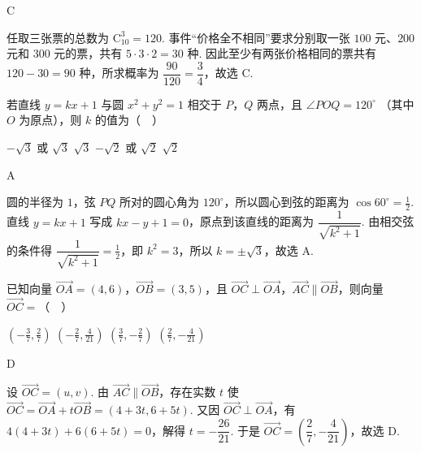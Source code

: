 \begin{answer}
C
\end{answer}

\begin{solution}
任取三张票的总数为 \(\mathrm C_{10}^{3}=120\). 事件“价格全不相同”要求分别取一张 \(100\) 元、\(200\) 元和 \(300\) 元的票，共有 \(5\cdot3\cdot2=30\) 种. 因此至少有两张价格相同的票共有 \(120-30=90\) 种，所求概率为 \(\dfrac{90}{120}=\dfrac34\)，故选 C.
\end{solution}

\begin{problem}
若直线 \( y = kx + 1 \) 与圆 \( x^{2} + y^{2} = 1 \) 相交于 \(P\)，\(Q\) 两点，且 \( \angle POQ = 120^{\circ} \) （其中 \(O\) 为原点），则 \( k \) 的值为（\(\quad\)）

\choices
    {\(-\sqrt{3}\) 或 \(\sqrt{3}\)}
    {\(\sqrt{3}\)}
    {\(-\sqrt{2}\) 或 \(\sqrt{2}\)}
    {\(\sqrt{2}\)}
\end{problem}

\begin{answer}
A
\end{answer}

\begin{solution}
圆的半径为 \(1\)，弦 \(PQ\) 所对的圆心角为 \(120^{\circ}\)，所以圆心到弦的距离为 \(\cos60^{\circ}=\frac12\). 直线 \(y=kx+1\) 写成 \(kx-y+1=0\)，原点到该直线的距离为 \(\dfrac{1}{\sqrt{k^2+1}}\). 由相交弦的条件得 \(\dfrac{1}{\sqrt{k^2+1}}=\frac12\)，即 \(k^2=3\)，所以 \(k=\pm\sqrt3\)，故选 A.
\end{solution}

\begin{problem}
已知向量 \(\overrightarrow{OA} = (4,6)\)，\(\overrightarrow{OB} = (3,5)\)，且 \(\overrightarrow{OC} \perp \overrightarrow{OA}\)，\(\overrightarrow{AC} \parallel \overrightarrow{OB}\)，则向量 \(\overrightarrow{OC} =\)（\(\quad\)）

\choices
    {\( \left(-\frac{3}{7},\frac{2}{7}\right) \)}
    {\( \left(-\frac{2}{7},\frac{4}{21}\right) \)}
    {\(\left(\frac{3}{7}, -\frac{2}{7}\right)\)}
    {\(\left(\frac{2}{7}, -\frac{4}{21}\right)\)}
\end{problem}

\begin{answer}
D
\end{answer}

\begin{solution}
设 \(\overrightarrow{OC}=(u,v)\). 由 \(\overrightarrow{AC}\parallel\overrightarrow{OB}\)，存在实数 \(t\) 使
\(\overrightarrow{OC}=\overrightarrow{OA}+t\overrightarrow{OB}=(4+3t,6+5t)\). 又因 \(\overrightarrow{OC}\perp\overrightarrow{OA}\)，有
\(4(4+3t)+6(6+5t)=0\)，解得 \(t=-\dfrac{26}{21}\). 于是
\(\overrightarrow{OC}=\left(\dfrac27,-\dfrac4{21}\right)\)，故选 D.
\end{solution}

